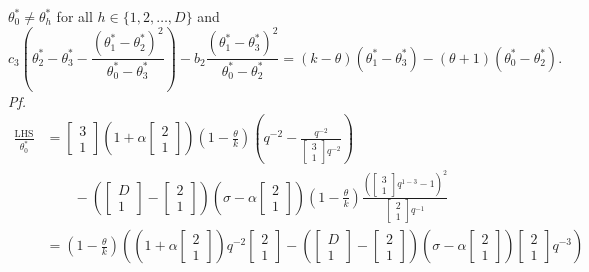 \documentclass[
]{book}
\theoremstyle{definition}
\theoremstyle{definition}
\theoremstyle{definition}
\theoremstyle{definition}
\theoremstyle{remark}
\begin{document}
\(\theta^*_0\neq \theta^*_h\) for all \(h\in \{1,2,\ldots, D\}\) and
\[c_3\left(\theta^*_2 - \theta^*_3 - \frac{(\theta^*_1-\theta^*_{2})^2}{\theta^*_0-\theta^*_3}\right) - b_{2} \frac{(\theta^*_1-\theta^*_{3})^2}{\theta^*_0-\theta^*_{2}} = (k-\theta)(\theta^*_1-\theta^*_3)-(\theta+1)(\theta^*_0-\theta^*_2).\]
\emph{Pf.}
\begin{align}
\frac{\mathrm{LHS}}{\theta^*_0} & = \begin{bmatrix}{3}\\{1}\end{bmatrix}\left(1+\alpha \begin{bmatrix}{2}\\{1}\end{bmatrix}\right)\left(1-\frac{\theta}{k}\right)\left(q^{-2} - \frac{q^{-2}}{\begin{bmatrix}{3}\\{1}\end{bmatrix}q^{-2}}\right)\\
& \qquad -\left(\begin{bmatrix}{D}\\{1}\end{bmatrix}-\begin{bmatrix}{2}\\{1}\end{bmatrix}\right)\left(\sigma-\alpha \begin{bmatrix}{2}\\{1}\end{bmatrix}\right)\left(1-\frac{\theta}{k}\right)\frac{\left(\begin{bmatrix}{3}\\{1}\end{bmatrix}q^{1-3}-1\right)^2}{\begin{bmatrix}{2}\\{1}\end{bmatrix}q^{-1}}\\
& = \left(1-\frac{\theta}{k}\right)\left(\left(1+\alpha\begin{bmatrix}{2}\\{1}\end{bmatrix}\right)q^{-2}\begin{bmatrix}{2}\\{1}\end{bmatrix}-\left(\begin{bmatrix}{D}\\{1}\end{bmatrix}-\begin{bmatrix}{2}\\{1}\end{bmatrix}\right)\left(\sigma-\alpha\begin{bmatrix}{2}\\{1}\end{bmatrix}\right)\begin{bmatrix}{2}\\{1}\end{bmatrix}q^{-3}\right)\\

\end{align}
\end{document}
